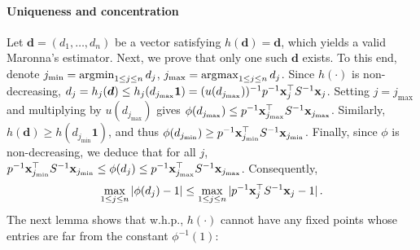\documentclass[times,sort&compress,3p]{elsarticle}
\begin{document}
\paragraph{Uniqueness and concentration}
Let $\mathbf{d}=(d_1,\ldots,d_n)$ be a vector satisfying $h(\mathbf{d})=\mathbf{d}$, which yields a valid Maronna's estimator. Next, we prove that only one such $\bm{d}$ exists. To this end,
denote $j_{\min} = \operatorname*{\arg\!\min}_{1\le j \le n} d_j$, $j_{\max} = \operatorname*{\arg\!\max}_{1\le j \le n} d_j$.
Since $h(\cdot)$ is non-decreasing, $d_j=h_j(\bm{d})\le h_j(d_{j_{\max}}\bm{1}) = (u(d_{j_{\max}}))^{-1}p^{-1}{\bf x}_j^\top S^{-1}{\bf x}_j$. Setting $j=j_{\max}$ and multiplying by $u(d_{j_{\max}})$ gives $\phi(d_{j_{\max}}) \le p^{-1}{\bf x}_{j_{\max}}^\top S^{-1}{\bf x}_{j_{\max}}$. 
Similarly, $h(\bm{d})\ge h(d_{j_{\min}}\bm{1})$, and thus $\phi(d_{j_{\min}}) \ge p^{-1}{\bf x}_{j_{\min}}^\top S^{-1}{\bf x}_{j_{\min}}$. Finally, since $\phi$ is non-decreasing, we deduce that for all $j$, $p^{-1}{\bf x}_{j_{\min}}^\top S^{-1}{\bf x}_{j_{\min}}\le \phi(d_j) \le p^{-1}{\bf x}_{j_{\max}}^\top S^{-1}{\bf x}_{j_{\max}}$. 
Consequently,
\begin{equation}\label{eq:maronna-1}
    \max_{1\le j \le n}|\phi(d_j)-1| \le \max_{1\le j \le n}|p^{-1}{\bf x}_j^\top S^{-1}{\bf x}_j-1| \,.
\end{equation}
The next lemma shows that w.h.p., $h(\cdot)$ cannot have any fixed points whose entries are far from the constant $\phi^{-1}(1)$:
\end{document}
